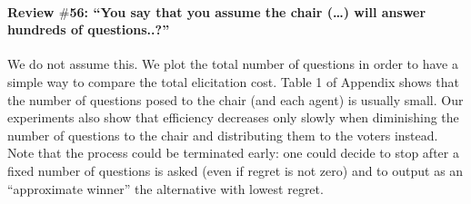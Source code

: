 \documentclass{article}
\begin{document}
\paragraph{Review $\#$56: “You say that you assume the chair (…) will answer hundreds of questions..?”}
We do not assume this. We plot the total number of questions in order to have a simple way to compare the total elicitation cost. 
Table 1 of Appendix shows that the number of questions posed to the chair (and each agent) is usually small. Our experiments also show that efficiency decreases only slowly when diminishing the number of questions to the chair and distributing them to the voters instead.
Note that the process could be terminated early: one could decide to stop after a fixed number of questions is asked (even if regret is not zero) and to output as an “approximate winner” the alternative with lowest regret.
\end{document}
